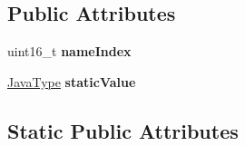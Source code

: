 \subsection*{Public Attributes}
\begin{DoxyCompactItemize}
\item 
uint16\+\_\+t {\bfseries name\+Index}\hypertarget{classFieldInfo_a88ea5c29063df8933d5277e846924b1e}{}\label{classFieldInfo_a88ea5c29063df8933d5277e846924b1e}

\item 
\hyperlink{structJavaType}{Java\+Type} {\bfseries static\+Value}\hypertarget{classFieldInfo_a3dad438d44c59fc319d708c6909c1807}{}\label{classFieldInfo_a3dad438d44c59fc319d708c6909c1807}

\end{DoxyCompactItemize}
\subsection*{Static Public Attributes}
